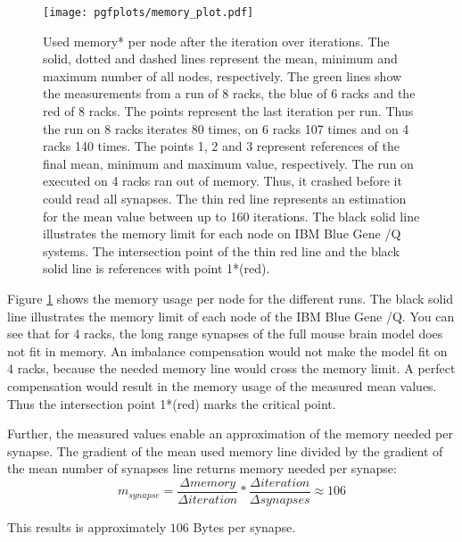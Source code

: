 \begin{figure}[h!]
\begin{center}
 \texttt{[image: pgfplots/memory\_plot.pdf]}
\end{center}
\caption{Used memory* per node after the iteration over iterations.
The solid, dotted and dashed lines represent the mean, minimum and maximum number of all nodes, respectively.
The green lines show the measurements from a run of 8 racks, the blue of 6 racks and the red of 8 racks.
The points represent the last iteration per run. Thus the run on 8 racks iterates 80 times, on 6 racks 107 times and on
4 racks 140 times. The points 1, 2 and 3 represent references of the final mean, minimum and maximum value, respectively.
The run on executed on 4 racks ran out of memory. Thus, it crashed before it could read all synapses.
The thin red line represents an estimation for the mean value between up to 160 iterations.
The black solid line illustrates the memory limit for each node on IBM Blue Gene /Q systems.
The intersection point of the thin red line and the black solid line is references with point 1*(red).
 }
\label{fig:memoryplot}
\end{figure}
Figure \ref{fig:memoryplot} shows the memory usage per node for the different runs.
The black solid line illustrates the memory limit of each node of the IBM Blue Gene /Q.
You can see that for 4 racks, the long range synapses of the full mouse brain model does not fit in memory.
An imbalance compensation would not make the model fit on $4$ racks,
because the needed memory line would cross the memory limit.
A perfect compensation would result in the memory usage of the measured mean values.
Thus the intersection point 1*(red) marks the critical point.

Further, the measured values enable an approximation of the memory needed per synapse.
The gradient of the mean used memory line divided by the gradient of the mean number of synapses line returns
memory needed per synapse:
\begin{equation}
	m_{synapse} = \frac{\Delta memory}{\Delta iteration} * \frac{\Delta iteration}{\Delta synapses} \approx 106
\end{equation}

This results is approximately $106$ Bytes per synapse.




